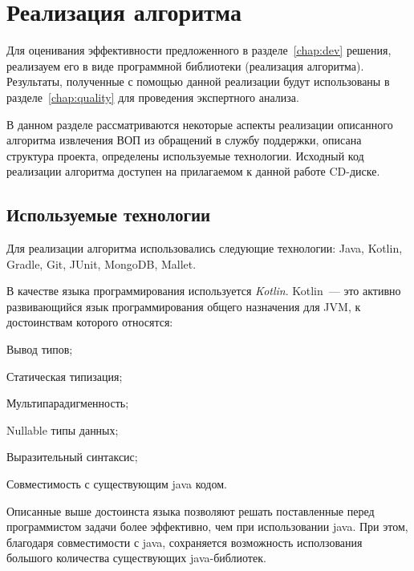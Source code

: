 \chapter{Реализация алгоритма}
\label{chap:impl}

Для оценивания эффективности предложенного в разделе~\ref{chap:dev} решения, реализауем его в виде программной библиотеки (реализация алгоритма). Результаты, полученные с помощью данной реализации будут использованы в разделе~\ref{chap:quality} для проведения экспертного анализа.

В данном разделе рассматриваются некоторые аспекты реализации описанного алгоритма извлечения ВОП из обращений в службу поддержки, описана структура проекта, определены используемые технологии. Исходный код реализации алгоритма доступен на прилагаемом к данной работе CD-диске.

\section{Используемые технологии}
Для реализации алгоритма использовались следующие технологии: Java, Kotlin, Gradle, Git, JUnit, MongoDB, Mallet.

В качестве языка программирования используется \textit{Kotlin}. Kotlin~--- это активно развивающийся язык программирования общего назначения для JVM, к достоинствам которого относятся:


\begin{itemize*}
\item Вывод типов;
\item Статическая типизация;
\item Мультипарадигменность;
\item Nullable типы данных;
\item Выразительный синтаксис;
\item Совместимость с существующим java кодом.
\end{itemize*}

Описанные выше достоинста языка позволяют решать поставленные перед программистом задачи более эффективно, чем при использовании java. При этом, благодаря совместимости с java, сохраняется возможность исползования большого количества существующих java-библиотек.

